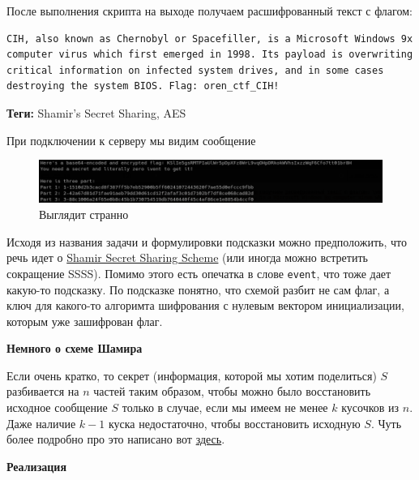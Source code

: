 \documentclass[idxtotoc,hyperref,openany,oneside]{files/crypto} %
\begin{document}
После выполнения скрипта на выходе получаем расшифрованный текст с флагом:
\begin{verbatim}
CIH, also known as Chernobyl or Spacefiller, is a Microsoft Windows 9x
computer virus which first emerged in 1998. Its payload is overwriting
critical information on infected system drives, and in some cases
destroying the system BIOS. Flag: oren_ctf_CIH!
\end{verbatim}



\textbf{Теги:} Shamir's Secret Sharing, AES\vspace{\baselineskip}

При подключении к серверу мы видим сообщение
\begin{figure}[H]
\begin{center}
\includegraphics[width=1.0\linewidth]{files/shamir_aes}
\end{center}
\caption{Выглядит странно}
\label{fig:chinese}
\end{figure}
Исходя из названия задачи и формулировки подсказки можно предположить, что речь идет о \href{https://en.wikipedia.org/wiki/Shamir\%27s_Secret_Sharing}{Shamir Secret Sharing Scheme} (или иногда можно встретить сокращение SSSS). Помимо этого есть опечатка в слове \verb|event|, что тоже дает какую-то подсказку. По подсказке понятно, что схемой разбит не сам флаг, а ключ для какого-то алгоримта шифрования с нулевым вектором инициализации, которым уже зашифрован флаг.

\textbf{Немного о схеме Шамира}

Если очень кратко, то секрет (информация, которой мы хотим поделиться) $S$ разбивается на $n$ частей таким образом, чтобы можно было восстановить исходное сообщение $S$ только в случае, если мы имеем не менее $k$ кусочков из $n$. Даже наличие $k-1$ куска недостаточно, чтобы восстановить исходную $S$. Чуть более подробно про это написано вот \href{https://habr.com/ru/post/431392/}{здесь}.

\textbf{Реализация}
\end{document}
